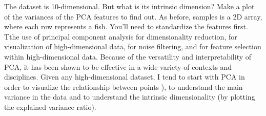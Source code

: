 \documentclass[11pt]{article}
\begin{document}
The dataset is 10-dimensional. But what is its intrinsic dimension? Make
a plot of the variances of the PCA features to find out. As before,
samples is a 2D array, where each row represents a fish. You'll need to
standardize the features first. Tthe use of principal component analysis
for dimensionality reduction, for visualization of high-dimensional
data, for noise filtering, and for feature selection within
high-dimensional data. Because of the versatility and interpretability
of PCA, it has been shown to be effective in a wide variety of contexts
and disciplines. Given any high-dimensional dataset, I tend to start
with PCA in order to visualize the relationship between points ), to
understand the main variance in the data and to understand the intrinsic
dimensionality (by plotting the explained variance ratio).
\end{document}

